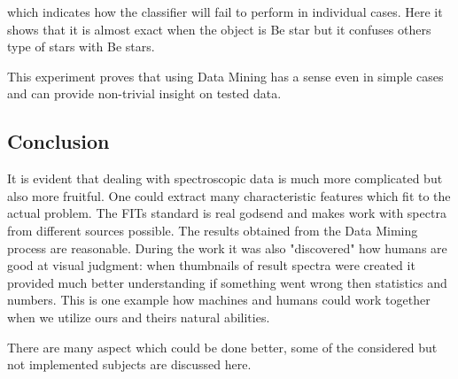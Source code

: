 which indicates how the classifier will fail to perform in individual
cases. Here it shows that it is almost exact when the object is Be
star but it confuses others type of stars with Be stars.

This experiment proves that using Data Mining has a sense even in
simple cases and can provide non-trivial insight on tested data.





\subsection{Conclusion}

It is evident that dealing with spectroscopic data is much more
complicated but also more fruitful. One could extract many
characteristic features which fit to the actual problem. The FITs
standard is real godsend and makes work with spectra from different
sources possible. The results obtained from the Data Miming process
are reasonable. During the work it was also "discovered" how humans
are good at visual judgment: when thumbnails of result spectra were
created it provided much better understanding if something went wrong
then statistics and numbers. This is one example how machines and
humans could work together when we utilize ours and theirs natural
abilities.

There are many aspect which could be done better, some of the
considered but not implemented subjects are discussed here.

